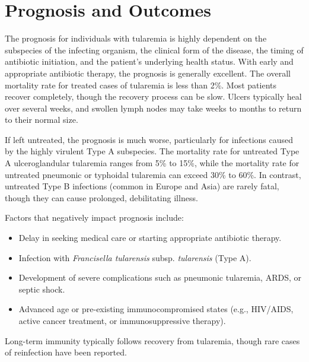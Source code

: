 \section*{Prognosis and Outcomes}
The prognosis for individuals with tularemia is highly dependent on the subspecies of the infecting organism, the clinical form of the disease, the timing of antibiotic initiation, and the patient's underlying health status.
With early and appropriate antibiotic therapy, the prognosis is generally excellent. The overall mortality rate for treated cases of tularemia is less than 2\%. Most patients recover completely, though the recovery process can be slow. Ulcers typically heal over several weeks, and swollen lymph nodes may take weeks to months to return to their normal size.

If left untreated, the prognosis is much worse, particularly for infections caused by the highly virulent Type A subspecies. The mortality rate for untreated Type A ulceroglandular tularemia ranges from 5\% to 15\%, while the mortality rate for untreated pneumonic or typhoidal tularemia can exceed 30\% to 60\%. In contrast, untreated Type B infections (common in Europe and Asia) are rarely fatal, though they can cause prolonged, debilitating illness.

Factors that negatively impact prognosis include:
\begin{itemize}
    \item Delay in seeking medical care or starting appropriate antibiotic therapy.
    \item Infection with \textit{Francisella tularensis} subsp. \textit{tularensis} (Type A).
    \item Development of severe complications such as pneumonic tularemia, ARDS, or septic shock.
    \item Advanced age or pre-existing immunocompromised states (e.g., HIV/AIDS, active cancer treatment, or immunosuppressive therapy).
\end{itemize}
Long-term immunity typically follows recovery from tularemia, though rare cases of reinfection have been reported.

